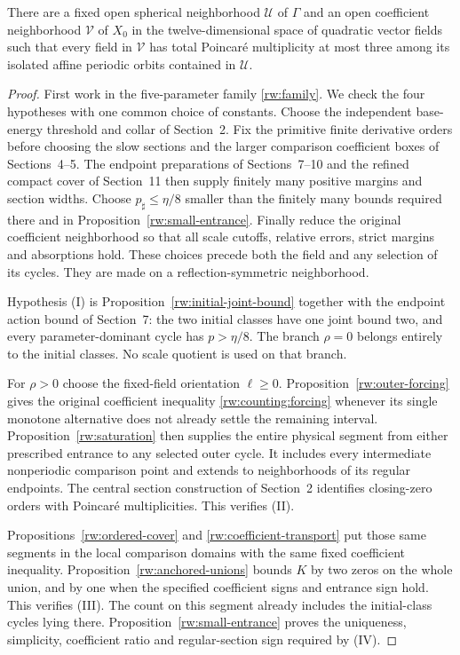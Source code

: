 \begin{theorem}\label{rw:upper-bound}
There are a fixed open spherical neighborhood $\mathscr U$ of
$\Gamma$ and an open coefficient neighborhood $\mathscr V$ of
$X_0$ in the twelve-dimensional space of quadratic vector fields
such that every field in $\mathscr V$ has total Poincar\'e
multiplicity at most three among its isolated affine periodic
orbits contained in $\mathscr U$.
\end{theorem}
\begin{proof}
First work in the five-parameter family \eqref{rw:family}.
We check the four hypotheses with one common choice of constants.
Choose the independent base-energy threshold and collar of Section~2.
Fix the primitive finite derivative orders before choosing the slow
sections and the larger comparison coefficient boxes of Sections~4--5.
The endpoint preparations of Sections~7--10 and the refined compact
cover of Section~11 then supply finitely many positive margins and
section widths. Choose $p_\sharp\le\eta/8$ smaller than the finitely
many bounds required there and in Proposition~\ref{rw:small-entrance}.
Finally reduce the original coefficient neighborhood so that all
scale cutoffs, relative errors, strict margins and absorptions hold.
These choices precede both the field and any selection of its cycles.
They are made on a reflection-symmetric neighborhood.

Hypothesis \textup{(I)} is Proposition~\ref{rw:initial-joint-bound}
together with the endpoint action bound of Section~7: the two initial
classes have one joint bound two, and every parameter-dominant cycle
has $p>\eta/8$. The branch $\rho=0$ belongs entirely to the initial
classes. No scale quotient is used on that branch.

For $\rho>0$ choose the fixed-field orientation $\ell\ge0$.
Proposition~\ref{rw:outer-forcing} gives the original coefficient
inequality \eqref{rw:counting:forcing} whenever its single monotone
alternative does not already settle the remaining interval.
Proposition~\ref{rw:saturation} then supplies the entire physical
segment from either prescribed entrance to any selected outer cycle.
It includes every intermediate nonperiodic comparison point and
extends to neighborhoods of its regular endpoints. The central
section construction of Section~2 identifies closing-zero orders
with Poincar\'e multiplicities. This verifies \textup{(II)}.

Propositions~\ref{rw:ordered-cover} and
\ref{rw:coefficient-transport} put those same segments in the local
comparison domains with the same fixed coefficient inequality.
Proposition~\ref{rw:anchored-unions} bounds $K$ by two zeros on the
whole union, and by one when the specified coefficient signs and
entrance sign hold. This verifies \textup{(III)}. The count on this
segment already includes the initial-class cycles lying there.
Proposition~\ref{rw:small-entrance} proves the uniqueness, simplicity,
coefficient ratio and regular-section sign required by \textup{(IV)}.


\end{proof}
